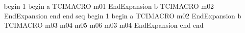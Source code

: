 begin
1
begin
a
TCIMACRO
m01
EndExpansion
b
TCIMACRO
m02
EndExpansion
end
end
seq
begin
1
begin
a
TCIMACRO
m02
EndExpansion
b
TCIMACRO
m03 m04 m05
m06 m03 m04
EndExpansion
end
end
